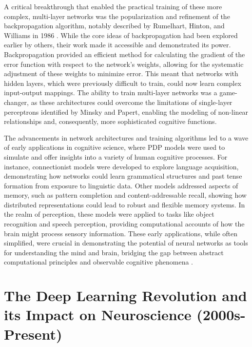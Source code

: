 \documentclass[11pt,a4paper]{article}
\begin{document}
A critical breakthrough that enabled the practical training of these more complex, multi-layer networks was the popularization and refinement of the backpropagation algorithm, notably described by Rumelhart, Hinton, and Williams in 1986 \cite{rumelhart1986learning}. While the core ideas of backpropagation had been explored earlier by others, their work made it accessible and demonstrated its power. Backpropagation provided an efficient method for calculating the gradient of the error function with respect to the network's weights, allowing for the systematic adjustment of these weights to minimize error. This meant that networks with hidden layers, which were previously difficult to train, could now learn complex input-output mappings. The ability to train multi-layer networks was a game-changer, as these architectures could overcome the limitations of single-layer perceptrons identified by Minsky and Papert, enabling the modeling of non-linear relationships and, consequently, more sophisticated cognitive functions.

The advancements in network architectures and training algorithms led to a wave of early applications in cognitive science, where PDP models were used to simulate and offer insights into a variety of human cognitive processes. For instance, connectionist models were developed to explore language acquisition, demonstrating how networks could learn grammatical structures and past tense formation from exposure to linguistic data. Other models addressed aspects of memory, such as pattern completion and content-addressable recall, showing how distributed representations could lead to robust and flexible memory systems. In the realm of perception, these models were applied to tasks like object recognition and speech perception, providing computational accounts of how the brain might process sensory information. These early applications, while often simplified, were crucial in demonstrating the potential of neural networks as tools for understanding the mind and brain, bridging the gap between abstract computational principles and observable cognitive phenomena \cite{mcclelland1986parallel}.

\section{The Deep Learning Revolution and its Impact on Neuroscience (2000s-Present)}
\end{document}
